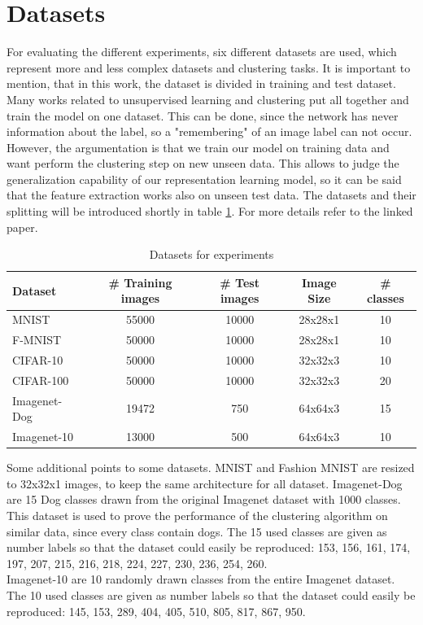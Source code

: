 \documentclass[12pt,DIV14,BCOR12mm,a4paper,footexclude,headinclude,halfparskip-,twoside,openright,openany,cleardoubleempty,idxtotoc,bibtotoc]{scrreprt} %
\numberwithin{equation}{chapter}
\begin{document}
\section{Datasets}
For evaluating the different experiments, six different datasets are used, which represent more and less complex datasets and clustering tasks. It is important to mention, that in this work, the dataset is divided in training and test dataset. Many works related to unsupervised learning and clustering put all together and train the model on one dataset. This can be done, since the network has never information about the label, so a "remembering" of an image label can not occur. However, the argumentation is that we train our model on training data and want perform the clustering step on new unseen data. This allows to judge the generalization capability of our representation learning model, so it can be said that the feature extraction works also on unseen test data. The datasets and their splitting will be introduced shortly in table \ref{tab:Datasets}. For more details refer to the linked paper.
\begin{table}[htb!]
    \centering
    \caption{Datasets for experiments}
    \label{tab:Datasets}
    \begin{tabular}{lcccc}
        \toprule
        Dataset & \# Training images & \# Test images & Image Size & \# classes\\
        \midrule
        MNIST \cite{MNIST-Data} & 55000 & 10000 & 28x28x1 & 10\\
        F-MNIST \cite{xiao17F-MNIST} & 50000 & 10000 & 28x28x1 & 10\\
        CIFAR-10 \cite{Krizhevsky09CIFAR} & 50000 & 10000 & 32x32x3 & 10\\
        CIFAR-100 \cite{Krizhevsky09CIFAR} & 50000 & 10000 & 32x32x3 & 20\\
        Imagenet-Dog \cite{imagenet_cvpr09} & 19472 & 750 & 64x64x3 & 15\\
        Imagenet-10 \cite{imagenet_cvpr09} & 13000 & 500 & 64x64x3 & 10\\
        \bottomrule
    \end{tabular}
\end{table}
Some additional points to some datasets. MNIST and Fashion MNIST are resized to 32x32x1 images, to keep the same architecture for all dataset. Imagenet-Dog are  15 Dog classes drawn from the original Imagenet dataset with 1000 classes. This dataset is used to prove the performance of the clustering algorithm on similar data, since every class contain dogs. The 15 used classes are given as number labels so that the dataset could easily be reproduced: 153, 156, 161, 174, 197, 207, 215, 216, 218, 224, 227, 230, 236, 254, 260.\\
Imagenet-10 are 10 randomly drawn classes from the entire Imagenet dataset. The 10 used classes are given as number labels so that the dataset could easily be reproduced: 145, 153, 289, 404, 405, 510, 805, 817, 867, 950.
\end{document}
